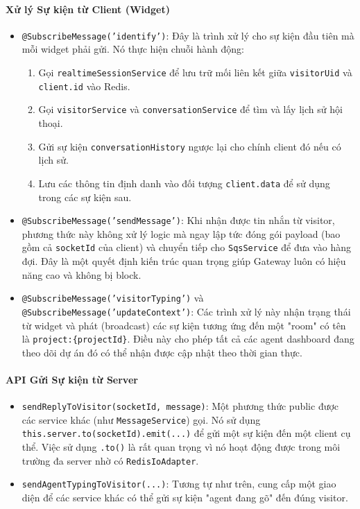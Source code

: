 \paragraph{Xử lý Sự kiện từ Client (Widget)}
\begin{itemize}
    \item \texttt{@SubscribeMessage('identify')}: Đây là trình xử lý cho sự kiện đầu tiên mà mỗi widget phải gửi. Nó thực hiện chuỗi hành động:
    \begin{enumerate}
        \item Gọi \texttt{realtimeSessionService} để lưu trữ mối liên kết giữa \texttt{visitorUid} và \texttt{client.id} vào Redis.
        \item Gọi \texttt{visitorService} và \texttt{conversationService} để tìm và lấy lịch sử hội thoại.
        \item Gửi sự kiện \texttt{conversationHistory} ngược lại cho chính client đó nếu có lịch sử.
        \item Lưu các thông tin định danh vào đối tượng \texttt{client.data} để sử dụng trong các sự kiện sau.
    \end{enumerate}
    
    \item \texttt{@SubscribeMessage('sendMessage')}: Khi nhận được tin nhắn từ visitor, phương thức này không xử lý logic mà ngay lập tức đóng gói payload (bao gồm cả \texttt{socketId} của client) và chuyển tiếp cho \texttt{SqsService} để đưa vào hàng đợi. Đây là một quyết định kiến trúc quan trọng giúp Gateway luôn có hiệu năng cao và không bị block.
    
    \item \texttt{@SubscribeMessage('visitorTyping')} và \texttt{@SubscribeMessage('updateContext')}: Các trình xử lý này nhận trạng thái từ widget và phát (broadcast) các sự kiện tương ứng đến một "room" có tên là \texttt{project:\{projectId\}}. Điều này cho phép tất cả các agent dashboard đang theo dõi dự án đó có thể nhận được cập nhật theo thời gian thực.
\end{itemize}

\paragraph{API Gửi Sự kiện từ Server}
\begin{itemize}
    \item \texttt{sendReplyToVisitor(socketId, message)}: Một phương thức public được các service khác (như \texttt{MessageService}) gọi. Nó sử dụng \texttt{this.server.to(socketId).emit(...)} để gửi một sự kiện đến một client cụ thể. Việc sử dụng \texttt{.to()} là rất quan trọng vì nó hoạt động được trong môi trường đa server nhờ có \texttt{RedisIoAdapter}.
    
    \item \texttt{sendAgentTypingToVisitor(...)}: Tương tự như trên, cung cấp một giao diện để các service khác có thể gửi sự kiện "agent đang gõ" đến đúng visitor.
\end{itemize}